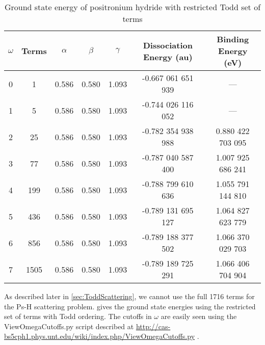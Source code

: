 \documentclass[Dissertation.tex]{subfiles}
\begin{document}
\setlength{\abovecaptionskip}{6pt}   %
\setlength{\belowcaptionskip}{6pt}   %
\begin{table}[H]
\centering
\begin{tabular}{c c c c c c c}
\toprule
$\omega$ & Terms & $\alpha$ & $\beta$ & $\gamma$ & Dissociation Energy (au) & Binding Energy (eV) \\ [0.5ex]
\midrule
0 & 1 & 0.586 & 0.580 & 1.093 & -0.667 061 651 939 & --- \\
1 & 5 & 0.586 & 0.580 & 1.093 & -0.744 026 116 052 & --- \\
2 & 25 & 0.586 & 0.580 & 1.093 & -0.782 354 938 988 & 0.880 422 703 095 \\
3 & 77 & 0.586 & 0.580 & 1.093 & -0.787 040 587 400 & 1.007 925 686 241 \\
4 & 199 & 0.586 & 0.580 & 1.093 & -0.788 799 610 636 & 1.055 791 144 810 \\
5 & 436 & 0.586 & 0.580 & 1.093 & -0.789 131 695 127 & 1.064 827 623 779 \\
6 & 856 & 0.586 & 0.580 & 1.093 & -0.789 188 377 502 & 1.066 370 029 703 \\
7 & 1505 & 0.586 & 0.580 & 1.093 & -0.789 189 725 291 & 1.066 406 704 904 \\
\bottomrule
\end{tabular}
\caption{Ground state energy of positronium hydride with restricted Todd set of terms} %
\label{tab:BoundEnergyTodd1}
\end{table}

As described later in \cref{sec:ToddScattering}, we cannot use the full 1716 terms for the Ps-H scattering problem.  gives the ground state energies using the restricted set of terms with Todd ordering. The cutoffs in $\omega$ are easily seen using the ViewOmegaCutoffs.py script described at \url{http://cas-bs5cph1.phys.unt.edu/wiki/index.php/ViewOmegaCutoffs.py} \cite{Wiki}.
\end{document}

